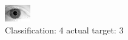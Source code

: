 \begin{figure}[h!]
\begin{center}
\includegraphics[width=0.60\columnwidth]{figures/ID2131_class_4_target_3.png}
\end{center}
\caption{ Classification: 4 actual target: 3}
\label{fig:ID2131_class_4_target_3}
\end{figure}
